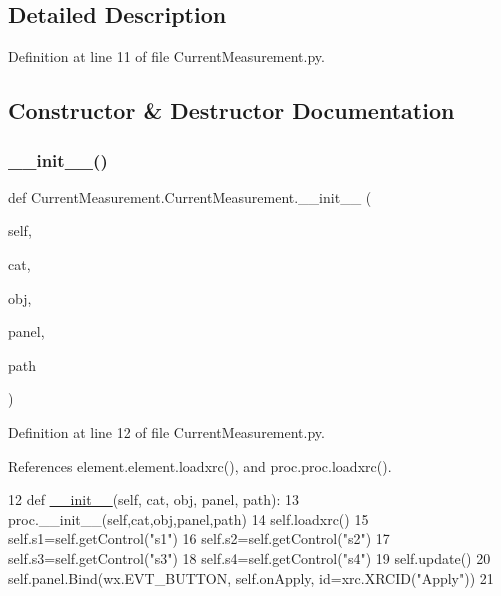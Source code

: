 \subsection{Detailed Description}


Definition at line 11 of file Current\+Measurement.\+py.



\subsection{Constructor \& Destructor Documentation}
\mbox{\label{classCurrentMeasurement_1_1CurrentMeasurement_a6c638933aeb8a6ab17b3ff69823d259e}} 
\subsubsection{\texorpdfstring{\+\_\+\+\_\+init\+\_\+\+\_\+()}{\_\_init\_\_()}}
{\footnotesize\ttfamily def Current\+Measurement.\+Current\+Measurement.\+\_\+\+\_\+init\+\_\+\+\_\+ (\begin{DoxyParamCaption}\item[{}]{self,  }\item[{}]{cat,  }\item[{}]{obj,  }\item[{}]{panel,  }\item[{}]{path }\end{DoxyParamCaption})}



Definition at line 12 of file Current\+Measurement.\+py.



References element.\+element.\+loadxrc(), and proc.\+proc.\+loadxrc().


\begin{DoxyCode}
12     \textcolor{keyword}{def }\hyperlink{classwrapper_1_1ModuleDictWrapper_a9a7a794150502f51df687831583e13b9}{\_\_init\_\_}(self, cat, obj, panel, path):
13         proc.\_\_init\_\_(self,cat,obj,panel,path)
14         self.loadxrc()
15         self.s1=self.getControl(\textcolor{stringliteral}{"s1"})
16         self.s2=self.getControl(\textcolor{stringliteral}{"s2"})
17         self.s3=self.getControl(\textcolor{stringliteral}{"s3"})
18         self.s4=self.getControl(\textcolor{stringliteral}{"s4"})
19         self.update()
20         self.panel.Bind(wx.EVT\_BUTTON, self.onApply, id=xrc.XRCID(\textcolor{stringliteral}{"Apply"}))
21 
\end{DoxyCode}


